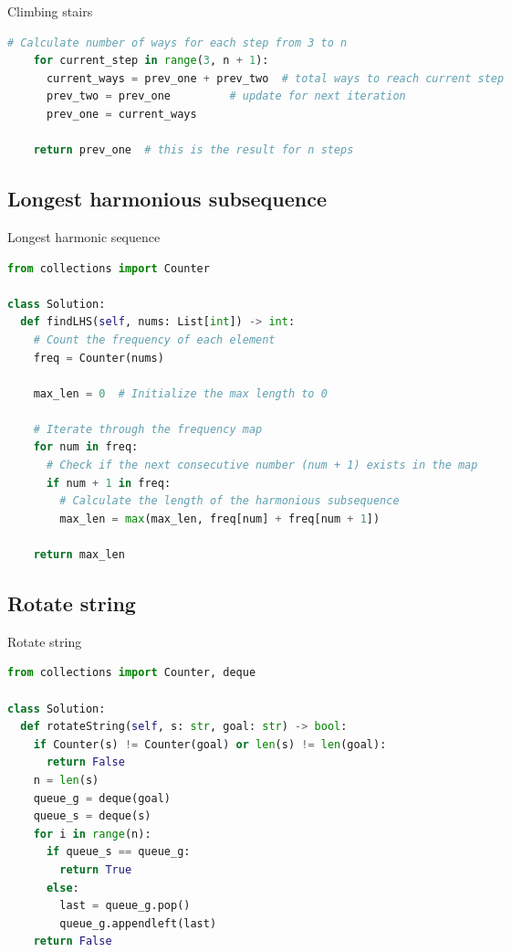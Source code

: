 \documentclass[a4paper,12pt]{article}
\begin{document}
\begin{multicols}{2}
\begin{mycode}[label={lst:climbing-stairs}]{Climbing stairs}
\begin{lstlisting}[language=Python]
    # Calculate number of ways for each step from 3 to n
    for current_step in range(3, n + 1):
      current_ways = prev_one + prev_two  # total ways to reach current step
      prev_two = prev_one         # update for next iteration
      prev_one = current_ways

    return prev_one  # this is the result for n steps
\end{lstlisting}
\end{mycode}

\subsection{Longest harmonious subsequence}

\begin{mycode}[label={lst:longest-harmonic-sequence}]{Longest harmonic sequence}
\begin{lstlisting}[language=Python]
from collections import Counter

class Solution:
  def findLHS(self, nums: List[int]) -> int:
    # Count the frequency of each element
    freq = Counter(nums)
    
    max_len = 0  # Initialize the max length to 0
    
    # Iterate through the frequency map
    for num in freq:
      # Check if the next consecutive number (num + 1) exists in the map
      if num + 1 in freq:
        # Calculate the length of the harmonious subsequence
        max_len = max(max_len, freq[num] + freq[num + 1])
    
    return max_len
\end{lstlisting}
\end{mycode}

\subsection{Rotate string}

\begin{mycode}[label={lst:rotate-string}]{Rotate string}
\begin{lstlisting}[language=Python]
from collections import Counter, deque

class Solution:
  def rotateString(self, s: str, goal: str) -> bool:
    if Counter(s) != Counter(goal) or len(s) != len(goal):
      return False
    n = len(s)
    queue_g = deque(goal)
    queue_s = deque(s)
    for i in range(n):
      if queue_s == queue_g:
        return True
      else:
        last = queue_g.pop()
        queue_g.appendleft(last)
    return False
\end{lstlisting}
\end{mycode}


\end{multicols}
\end{document}
